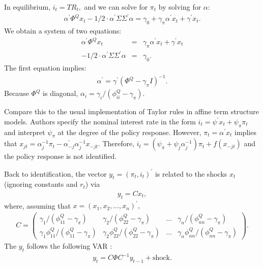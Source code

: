 \documentclass[11pt]{article}
\begin{document}
In equilibrium,  $i_t=TR_t,$ and we can solve for $\pi_t$ by solving for $\alpha:$
\begin{eqnarray}
    \alpha^{\prime}\Phi^Q x_t  -1/2\cdot  \alpha^{\prime} \Sigma \Sigma^{\prime} \alpha=  \gamma_0 + \gamma_{\pi}\alpha^{\prime}x_t+ \gamma^{\prime} x_t.
\end{eqnarray}
    We obtain a system of two equations:
 \begin{eqnarray}
     \alpha^{\prime}\Phi^Q x_t & = &\gamma_{\pi}\alpha^{\prime}x_t+ \gamma^{\prime} x_t \\
     -1/2\cdot  \alpha^{\prime} \Sigma \Sigma^{\prime} \alpha &=& \gamma_0.
 \end{eqnarray}
 The first equation implies:
 \begin{eqnarray}
     \alpha^{\prime}=\gamma^{\prime} \left(\Phi^Q-\gamma_{\pi} I\right)^{-1}.
 \end{eqnarray}
Because $\Phi^Q$ is diagonal, $\alpha_i=\gamma_i /(\phi_{ii}^Q-\gamma_{\pi}).$ %

Compare this to the usual implementation of Taylor rules in affine term structure models. Authors specify the nominal interest rate in the form $i_t=\psi^{\prime}x_t+\psi_{\pi}\pi_t$ and interpret $\psi_{\pi}$ at the degree of the policy response. However, $\pi_t=\alpha^{\prime}x_t$ implies that $x_{jt}=\alpha_j^{-1}\pi_t-\alpha_{-j}^{\prime}\alpha_j^{-1}x_{-jt}.$ Therefore, $i_t=(\psi_{\pi}+\psi_j \alpha_j^{-1})\pi_t + f(x_{-jt})$ and the policy response is not identified.

Back to identification, the vector $y_t=(\pi_t, i_t)^{\prime}$ is related to the shocks $x_t$ (ignoring constants and $r_t$) via
\begin{eqnarray}
    y_t=Cx_t,
\end{eqnarray}
where, assuming  that $x=(x_1, x_2, \ldots, x_n)^{\prime},$
\begin{eqnarray}
    C=
\left(
\begin{array}{cccc}
\gamma_1 /(\phi_{11}^Q-\gamma_{\pi})  &   \gamma_2/(\phi_{22}^Q-\gamma_{\pi}) &  \ldots & \gamma_n/(\phi_{nn}^Q-\gamma_{\pi})   \\
\gamma_1 \phi_{11}^Q/(\phi_{11}^Q-\gamma_{\pi})  &   \gamma_2\phi_{22}^Q/(\phi_{22}^Q-\gamma_{\pi}) & \ldots &  \gamma_n\phi_{nn}^Q/(\phi_{nn}^Q-\gamma_{\pi} )
\end{array}
\right).
\end{eqnarray}
The $y_t$ follows the following VAR :
\begin{eqnarray}
   y_t= C \Phi C^{-1} y_{t-1} + \mbox{shock}.
\end{eqnarray}
\end{document}
